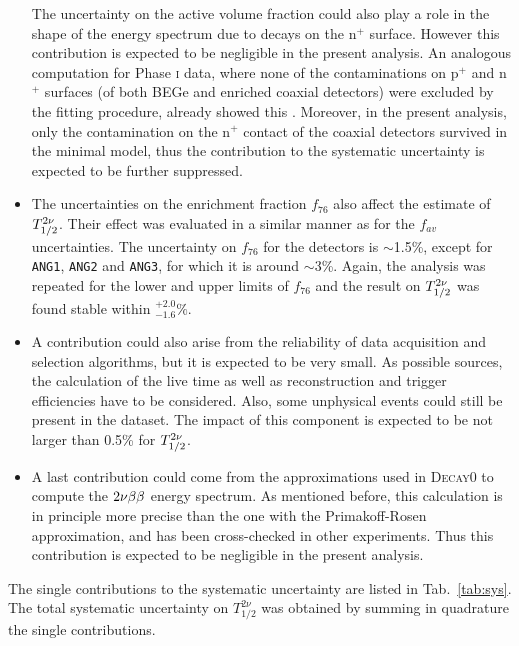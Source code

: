 \begin{itemize}
		The uncertainty on the active volume fraction could also play a role in the shape of the energy spectrum due to  decays on the n$^+$ surface. However this contribution is expected to be negligible in the present analysis. An analogous computation for {\gerda} Phase \textsc{i} data, where none of the  contaminations on p$^+$ and n$^+$ surfaces (of both BEGe and enriched coaxial detectors) were excluded by the fitting procedure, already showed this \cite{sabine}. Moreover, in the present analysis, only the  contamination on the n$^+$ contact of the coaxial detectors survived in the minimal model, thus the contribution to the systematic uncertainty is expected to be further suppressed.
	\item The uncertainties on the enrichment fraction $f_{76}$ also affect the estimate of $T_{1/2}^{2\nu}$. Their effect was evaluated in a similar manner as for the $f_{av}$ uncertainties. The uncertainty on $f_{76}$ for the detectors is $\sim$1.5\%, except for \texttt{ANG1}, \texttt{ANG2} and \texttt{ANG3}, for which it is around $\sim$3\%. Again, the analysis was repeated for the lower and upper limits of $f_{76}$ and the result on $T_{1/2}^{2\nu}$ was found stable within $^{+2.0}_{-1.6}\%$.
	\item A contribution could also arise from the reliability of data acquisition and selection algorithms, but it is expected to be very small. As possible sources, the calculation of the live time as well as reconstruction and trigger efficiencies have to be considered. Also, some unphysical events could still be present in the dataset. The impact of this component is expected to be not larger than 0.5\% for $T_{1/2}^{2\nu}$.
	\item A last contribution could come from the approximations used in \textsc{Decay0} to compute the $2\nu\beta\beta$ energy spectrum. As mentioned before, this calculation is in principle more precise than the one with the Primakoff-Rosen approximation, and has been cross-checked in other experiments. Thus this contribution is expected to be negligible in the present analysis.
\end{itemize}

The single contributions to the systematic uncertainty are listed in Tab.~\ref{tab:sys}. The total systematic uncertainty on $T_{1/2}^{2\nu}$ was obtained by summing in quadrature the single contributions.

